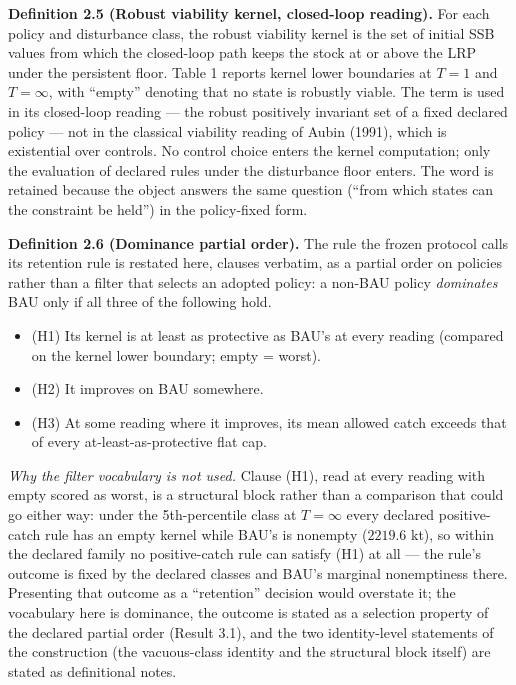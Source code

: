 \documentclass[11pt]{article}
\providecommand{\tightlist}{\setlength{\itemsep}{0pt}\setlength{\parskip}{0pt}}
\begin{document}
\textbf{Definition 2.5 (Robust viability kernel, closed-loop reading).}
For each policy and disturbance class, the robust viability kernel is
the set of initial SSB values from which the closed-loop path keeps the
stock at or above the LRP under the persistent floor. Table 1 reports
kernel lower boundaries at \(T=1\) and \(T=\infty\), with ``empty''
denoting that no state is robustly viable. The term is used in its
closed-loop reading --- the robust positively invariant set of a fixed
declared policy --- not in the classical viability reading of Aubin
(1991), which is existential over controls. No control choice enters the
kernel computation; only the evaluation of declared rules under the
disturbance floor enters. The word is retained because the object
answers the same question (``from which states can the constraint be
held'') in the policy-fixed form.

\textbf{Definition 2.6 (Dominance partial order).} The rule the frozen
protocol calls its retention rule is restated here, clauses verbatim, as
a partial order on policies rather than a filter that selects an adopted
policy: a non-BAU policy \emph{dominates} BAU only if all three of the
following hold.

\begin{itemize}
\tightlist
\item
  (H1) Its kernel is at least as protective as BAU's at every reading
  (compared on the kernel lower boundary; empty = worst).
\item
  (H2) It improves on BAU somewhere.
\item
  (H3) At some reading where it improves, its mean allowed catch exceeds
  that of every at-least-as-protective flat cap.
\end{itemize}

\emph{Why the filter vocabulary is not used.} Clause (H1), read at every
reading with empty scored as worst, is a structural block rather than a
comparison that could go either way: under the 5th-percentile class at
\(T=\infty\) every declared positive-catch rule has an empty kernel
while BAU's is nonempty (\(2219.6\) kt), so within the declared family
no positive-catch rule can satisfy (H1) at all --- the rule's outcome is
fixed by the declared classes and BAU's marginal nonemptiness there.
Presenting that outcome as a ``retention'' decision would overstate it;
the vocabulary here is dominance, the outcome is stated as a selection
property of the declared partial order (Result 3.1), and the two
identity-level statements of the construction (the vacuous-class
identity and the structural block itself) are stated as definitional
notes.
\end{document}
